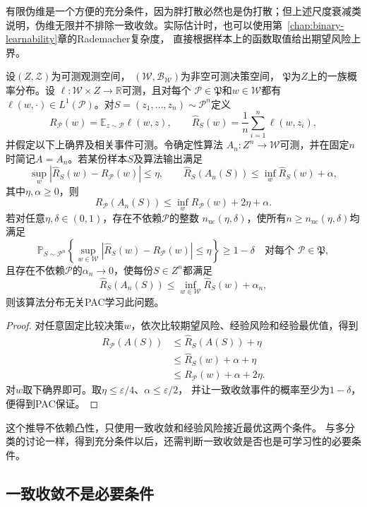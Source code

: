 有限伪维是一个方便的充分条件，因为胖打散必然也是伪打散；但上述尺度衰减类
说明，伪维无限并不排除一致收敛。实际估计时，也可以使用第~\ref{chap:binary-learnability}章的Rademacher复杂度，
直接根据样本上的函数取值给出期望风险上界。

\begin{theorem}[一致收敛推出一般学习保证]
\label{thm:general-uniform-pac}
设$(Z,\mathcal Z)$为可测观测空间，
$(\mathcal W,\mathcal B_{\mathcal W})$为非空可测决策空间，
$\mathfrak P$为$Z$上的一族概率分布。设
$\ell:\mathcal W\times Z\to\mathbb R$可测，且对每个
$\mathcal P\in\mathfrak P$和$w\in\mathcal W$都有
$\ell(w,\cdot)\in L^1(\mathcal P)$。对$S=(z_1,\ldots,z_n)\sim\mathcal P^n$定义
\[
 R_{\mathcal P}(w)=\mathbb E_{z\sim\mathcal P}\ell(w,z),
 \qquad
 \hat R_S(w)=\frac1n\sum_{i=1}^n\ell(w,z_i),
\]
并假定以下上确界及相关事件可测。令确定性算法
$A_n:Z^n\to\mathcal W$可测，并在固定$n$时简记$A=A_n$。若某份样本$S$及算法输出满足
\[
 \sup_w|\hat R_S(w)-R_{\mathcal P}(w)|\leq\eta,\qquad
 \hat R_S(A_n(S))\leq\inf_w\hat R_S(w)+\alpha,
\]
其中$\eta,\alpha\geq0$，则
\[
 R_{\mathcal P}(A_n(S))\leq\inf_w R_{\mathcal P}(w)+2\eta+\alpha.
\]
若对任意$\eta,\delta\in(0,1)$，存在不依赖$\mathcal P$的整数
$n_{\mathrm{uc}}(\eta,\delta)$，使所有$n\geq n_{\mathrm{uc}}(\eta,\delta)$均满足
\[
 \mathbb P_{S\sim\mathcal P^n}\!\left\{
 \sup_{w\in\mathcal W}|\hat R_S(w)-R_{\mathcal P}(w)|\leq\eta
 \right\}\geq1-\delta
 \quad\text{对每个 }\mathcal P\in\mathfrak P,
\]
且存在不依赖$\mathcal P$的$\alpha_n\to0$，使每份$S\in Z^n$都满足
\[
 \hat R_S(A_n(S))\leq\inf_{w\in\mathcal W}\hat R_S(w)+\alpha_n,
\]
则该算法分布无关PAC学习此问题。
\end{theorem}
\begin{proof}
对任意固定比较决策$w$，依次比较期望风险、经验风险和经验最优值，得到
\begin{align*}
 R_{\mathcal P}(A(S))&\leq\hat R_S(A(S))+\eta\\
 &\leq\hat R_S(w)+\alpha+\eta\\
 &\leq R_{\mathcal P}(w)+\alpha+2\eta.
\end{align*}
对$w$取下确界即可。取$\eta\leq\varepsilon/4$、$\alpha\leq\varepsilon/2$，
并让一致收敛事件的概率至少为$1-\delta$，便得到PAC保证。
\end{proof}

这个推导不依赖凸性，只使用一致收敛和经验风险接近最优这两个条件。
与多分类的讨论一样，得到充分条件以后，还需判断一致收敛是否也是可学习性的必要条件。

\subsection{一致收敛不是必要条件}

